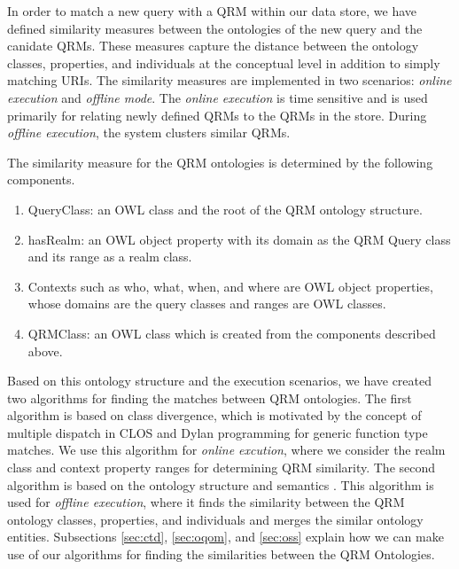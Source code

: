 \documentclass{IOS-Book-Article}
\begin{document}
In order to match a new query with a QRM within our data store, we have defined similarity measures between the ontologies of the new query and the canidate QRMs. These measures capture the distance between the ontology classes, properties, and individuals at the conceptual level in addition to simply matching URIs. The similarity measures are implemented in two scenarios: \textit{online execution} and \textit{offline mode}. The \textit{online execution} is time sensitive and is used primarily for relating newly defined QRMs to the QRMs in the store. During \textit{offline execution}, the system clusters similar QRMs.

The similarity measure for the QRM ontologies is determined by the following components.
\begin{enumerate}
    \item QueryClass: an OWL class and the root of the QRM ontology structure.
    \item hasRealm: an OWL object property with its domain as the QRM Query class and its range as a realm class.
    \item Contexts such as who, what, when, and where are OWL object properties, whose domains are the query classes and ranges are OWL classes. 
    \item QRMClass: an OWL class which is created from the components described above.
\end{enumerate}
Based on this ontology structure and the execution scenarios, we have created two algorithms for finding the matches between QRM ontologies. The first algorithm is based on class divergence, which is motivated by the concept of multiple dispatch in CLOS \cite{95411} and Dylan programming \cite{Dylan_MultipleInheritance} for generic function type matches. We use this algorithm for \textit{online excution}, where we consider the realm class and context property ranges for determining QRM similarity. The second algorithm is based on the ontology structure and semantics \cite{ST05}. This algorithm is used for \textit{offline execution}, where it finds the similarity between the QRM ontology classes, properties, and individuals and merges the similar ontology entities. Subsections \ref{sec:ctd}, \ref{sec:oqom}, and \ref{sec:oss} explain how we can make use of our algorithms for finding the similarities between the QRM Ontologies.

\end{document}
